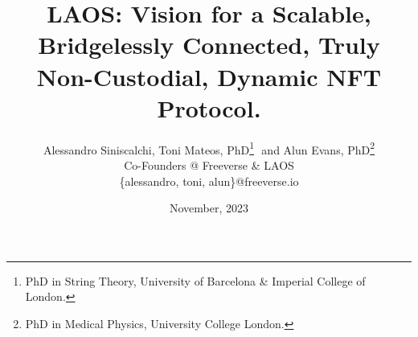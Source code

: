 \documentclass{article}
\title{LAOS: Vision for a Scalable, Bridgelessly Connected, Truly Non-Custodial, Dynamic NFT Protocol.}
\author{
  Alessandro Siniscalchi,
  Toni Mateos, PhD\footnote{PhD in String Theory, University of Barcelona \& Imperial College of London.}
  $ $ and Alun Evans, PhD\footnote{PhD in Medical Physics, University College London.}
  \\
  Co-Founders @ Freeverse \& LAOS \\
  \{alessandro, toni, alun\}@freeverse.io
}
\date{November, 2023}
\begin{document}
\maketitle




\setlength{\columnsep}{20pt}
\begin{multicols}{2}











\end{multicols}
\end{document}
